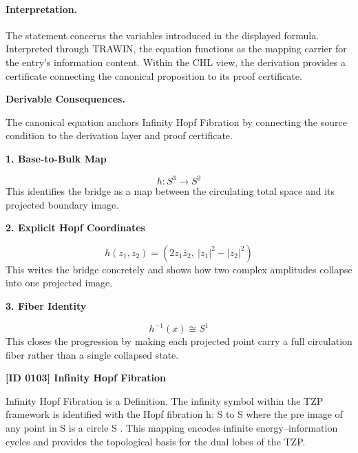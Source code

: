\paragraph{Interpretation.}
The statement concerns the variables introduced in the displayed formula. Interpreted through TRAWIN, the equation functions as the mapping carrier for the entry’s information content. Within the CHL view, the derivation provides a certificate connecting the canonical proposition to its proof certificate.

\par\vspace{0.35em}
\noindent\textbf{Derivable Consequences.}\quad
\begingroup
\footnotesize
\raggedright
The canonical equation anchors Infinity Hopf Fibration by connecting the source condition to the derivation layer and proof certificate.
\par\endgroup

\noindent\textbf{1. Base-to-Bulk Map}\par
\[
h : S^3 \longrightarrow S^2
\]
\noindent This identifies the bridge as a map between the circulating total space and its projected boundary image.\par
\noindent\textbf{2. Explicit Hopf Coordinates}\par
\[
h(z_1,z_2)=\left(2 z_1 \overline{z}_2,\ \lvert z_1\rvert^2-\lvert z_2\rvert^2\right)
\]
\noindent This writes the bridge concretely and shows how two complex amplitudes collapse into one projected image.\par
\noindent\textbf{3. Fiber Identity}\par
\[
h^{-1}(x)\cong S^1
\]
\noindent This closes the progression by making each projected point carry a full circulation fiber rather than a single collapsed state.\par

\clearpage
\noindent\textbf{[ID 0103] Infinity Hopf Fibration}\par
\vspace{0.35em}
\begingroup\small
{}
Infinity Hopf Fibration is a Definition. The infinity symbol within the TZP framework is identified with the Hopf fibration h: S  to S  where the pre image of any point in S  is a circle S . This mapping encodes infinite energy--information cycles and provides the topological basis for the dual lobes of the TZP.

